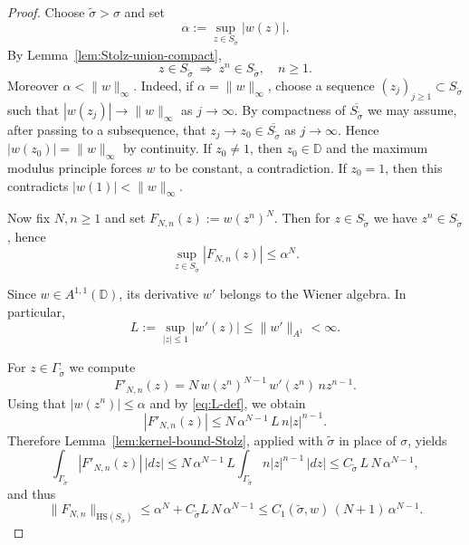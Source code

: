 \documentclass[11pt]{amsart}
\numberwithin{equation}{section}
\theoremstyle{definition}
\theoremstyle{plain}
\def\D{\mathbb{D}}
\newcommand{\HS}{\mathrm{HS}}
\begin{document}
\begin{proof}
Choose $\widetilde\sigma>\sigma$ and set
\[
   \alpha:=\sup_{z\in S_{\widetilde\sigma}}|w(z)|.
\]
By Lemma~\ref{lem:Stolz-union-compact},
\[
   z\in S_{\widetilde\sigma} \ \Longrightarrow\ z^n\in S_{\widetilde\sigma}, \quad n\ge1.
\]
Moreover $\alpha<\|w\|_\infty$. Indeed, 
if
\(\alpha=\|w\|_\infty\), choose a sequence
\(
   (z_j)_{j\ge1}\subset S_{\widetilde\sigma}
\)
such that
\(
   |w(z_j)|\to\|w\|_\infty
\)
as $j \to \infty.$
 By compactness of
$\overline{S_{\widetilde\sigma}}$ we may assume, after passing to a subsequence, that
$z_j\to z_0\in\overline{S_{\widetilde\sigma}}$ as $j\to\infty$. Hence
$|w(z_0)|=\|w\|_\infty$ by continuity. If $z_0\neq1$, then
$z_0\in\D$ and the maximum modulus principle forces $w$ to be constant,
a contradiction. If $z_0=1$, then this contradicts
$|w(1)|<\|w\|_\infty$.

Now fix $N,n\ge1$ and set $F_{N,n}(z):=w(z^n)^N$. Then for
$z\in S_{\widetilde\sigma}$ we have $z^n\in S_{\widetilde\sigma}$, hence
\[
   \sup_{z\in S_{\widetilde\sigma}}|F_{N,n}(z)|\le \alpha^N.
\]

Since $w\in A^{1,1}(\D)$, its derivative $w'$ belongs to the Wiener algebra.
In particular,
\begin{equation}\label{eq:L-def}
   L:=\sup_{|z|\le1}|w'(z)|
   \le %
   \|w'\|_{A^1}<\infty.
\end{equation}

For $z\in\Gamma_{\widetilde\sigma}$ we compute
\[
   F'_{N,n}(z)=N\,w(z^n)^{N-1}\,w'(z^n)\,n z^{n-1}.
\]
Using that $|w(z^n)|\le\alpha$ and by \eqref{eq:L-def}, we obtain 
\[
   |F'_{N,n}(z)|
   \le N\,\alpha^{N-1}\,L\,n|z|^{n-1}.
\]
Therefore Lemma~\ref{lem:kernel-bound-Stolz}, applied with
$\widetilde\sigma$ in place of $\sigma$, yields
\[
   \int_{\Gamma_{\widetilde\sigma}}|F'_{N,n}(z)|\,|dz|
   \le N\,\alpha^{N-1}\,L
      \int_{\Gamma_{\widetilde\sigma}}n|z|^{n-1}\,|dz|
   \le C_{\widetilde\sigma}\,L\,N\,\alpha^{N-1},
\]
and thus
\begin{equation}\label{eq:HS-FNn-A11}
   \|F_{N,n}\|_{\HS(S_{\widetilde\sigma})}
   \le \alpha^N + C_{\widetilde\sigma}L\,N\,\alpha^{N-1}
   \le C_1(\widetilde\sigma,w)\,(N+1)\,\alpha^{N-1}.
\end{equation}


\end{proof}
\end{document}
